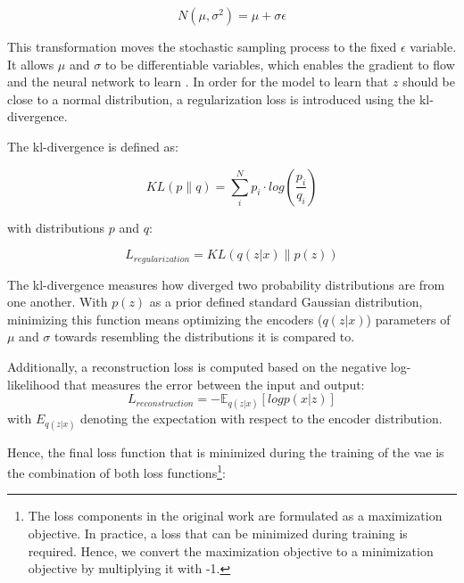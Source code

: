 \begin{equation}
  \label{eqn:reparameterization}
  N(\mu,\sigma^2) =\mu+\sigma\epsilon
\end{equation}


This transformation moves the stochastic sampling process to the fixed $\epsilon$ variable. 
It allows $\mu$ and $\sigma$ to be differentiable variables, which enables the gradient to flow and the neural network to learn \cite{kingma2013AutoEncodingVariationalBayes}.
In order for the model to learn that $z$ should be close to a normal distribution, a regularization loss is introduced using the \gls{kl}-divergence.

\noindent The \gls{kl}-divergence is defined as:

\begin{equation}
    \label{eqn:kl-divergence}
    KL(p\parallel q) = \sum_{i}^{N}p_i\cdot log(\frac{p_i}{q_i})
\end{equation}

with distributions $p$ and $q$:

\begin{equation}
    \label{eqn:regularization_loss}
    L_{regularization} = KL(q(z|x) \parallel p(z))
\end{equation}

The \gls{kl}-divergence measures how diverged two probability distributions are from one another.
With $p(z)$ as a prior defined standard Gaussian distribution, minimizing this function means optimizing the encoders ($q(z|x)$) parameters of $\mu$ and $\sigma$ towards resembling the distributions it is compared to.

\noindent Additionally, a reconstruction loss is computed based on the negative log-likelihood that measures the error between the input and output:
\begin{equation}
    \label{eqn:reconstruction_loss}
    L_{reconstruction} =-\mathbb{E}_{q(z|x)}[logp(x|z)]
\end{equation}
with $E_{q(z|x)}$ denoting the expectation with respect to the encoder distribution.

Hence, the final loss function that is minimized during the training of the \gls{vae} is the combination of both loss functions\footnote{The loss components in the original work \cite{kingma2013AutoEncodingVariationalBayes} are formulated as a maximization objective. In practice, a loss that can be minimized during training is required. Hence, we convert the maximization objective to a minimization objective by multiplying it with -1.}:

